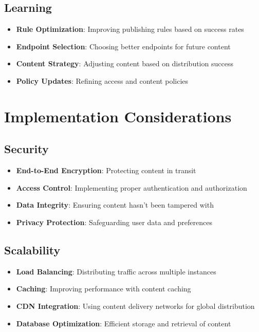 \documentclass[11pt]{article}
\begin{document}
\subsection{Learning}

\begin{itemize}
    \item \textbf{Rule Optimization}: Improving publishing rules based on success rates
    \item \textbf{Endpoint Selection}: Choosing better endpoints for future content
    \item \textbf{Content Strategy}: Adjusting content based on distribution success
    \item \textbf{Policy Updates}: Refining access and content policies
\end{itemize}

\section{Implementation Considerations}

\subsection{Security}

\begin{itemize}
    \item \textbf{End-to-End Encryption}: Protecting content in transit
    \item \textbf{Access Control}: Implementing proper authentication and authorization
    \item \textbf{Data Integrity}: Ensuring content hasn't been tampered with
    \item \textbf{Privacy Protection}: Safeguarding user data and preferences
\end{itemize}

\subsection{Scalability}

\begin{itemize}
    \item \textbf{Load Balancing}: Distributing traffic across multiple instances
    \item \textbf{Caching}: Improving performance with content caching
    \item \textbf{CDN Integration}: Using content delivery networks for global distribution
    \item \textbf{Database Optimization}: Efficient storage and retrieval of content
\end{itemize}
\end{document}
